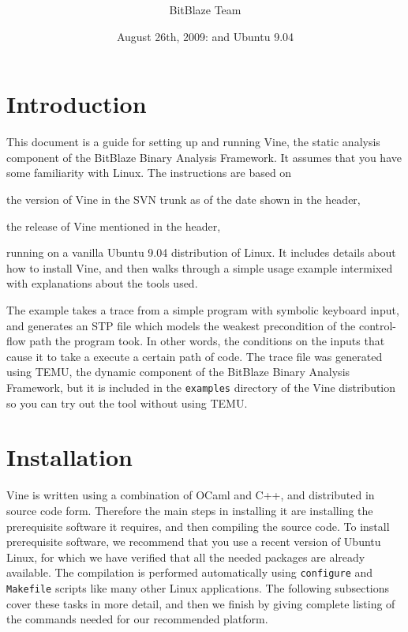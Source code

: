 \documentclass[11pt,onecolumn]{article}
\title{\mbox{}\\[-.8in]\bf \titled}
\author{BitBlaze Team}
\date{August 26th, 2009:
\sreither{SVN trunk r4183}{Release 1.0}
and Ubuntu 9.04}
\begin{document}
\maketitle

\tableofcontents

\section{Introduction}

This document is a guide for setting up and running Vine, the static
analysis component of the BitBlaze Binary Analysis Framework. It
assumes that you have some familiarity with Linux.  The instructions
are based on
\begin{svn}
the version of Vine in the SVN trunk as of the date shown
in the header,
\end{svn}
\begin{release}
the release of Vine mentioned in the header,
\end{release}
running on a vanilla Ubuntu 9.04 distribution of Linux.
It includes details about how to install Vine, and then walks through
a simple usage example intermixed with explanations about the tools
used.

The example takes a trace from a simple program with symbolic keyboard
input, and generates an STP file which models the weakest precondition
of the control-flow path the program took. In other words, the
conditions on the inputs that cause it to take a execute a certain
path of code. The trace file was generated using TEMU, the dynamic
component of the BitBlaze Binary Analysis Framework, but it is
included in the {\tt examples} directory of the Vine distribution so
you can try out the tool without using TEMU.

\section {\label{sec:install}Installation}

Vine is written using a combination of OCaml and C++, and distributed
in source code form.
%
Therefore the main steps in installing it are installing the
prerequisite software it requires, and then compiling the source code.
%
To install prerequisite software, we recommend that you use a recent
version of Ubuntu Linux, for which we have verified that all the
needed packages are already available.
%
The compilation is performed automatically using {\tt configure} and
{\tt Makefile} scripts like many other Linux applications.
%
The following subsections cover these tasks in more detail, and then
we finish by giving complete listing of the commands needed for our
recommended platform.
\end{document}
